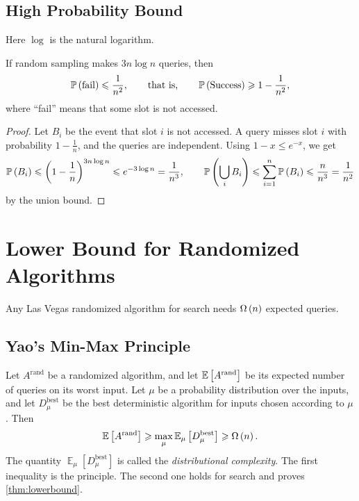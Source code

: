 \subsection{High Probability Bound}

Here $\log$ is the natural logarithm.

\begin{theorem}\label{thm:whp}
    If random sampling makes $3 n \log n$ queries, then
    \[\operatorname{\mathbb{P}}\left(\text{fail}\right) \leqslant \frac{1}{n^2},
        \qquad\text{that is,}\qquad
        \operatorname{\mathbb{P}}\left(\text{Success}\right) \geqslant 1 - \frac{1}{n^2},\]
    where ``fail'' means that some slot is not accessed.
\end{theorem}

\begin{proof}
    Let $B_i$ be the event that slot $i$ is not accessed. A query misses slot $i$ with
    probability $1 - \frac{1}{n}$, and the queries are independent. Using $1 - x \leq e^{-x}$, we get
    \[\operatorname{\mathbb{P}}\left(B_i\right) \leqslant \left(1 - \frac{1}{n}\right)^{3 n \log n}
        \leqslant e^{-3 \log n} = \frac{1}{n^3},
        \qquad
        \operatorname{\mathbb{P}}\left(\bigcup_{i} B_i\right) \leqslant \sum_{i=1}^{n} \operatorname{\mathbb{P}}\left(B_i\right) \leqslant \frac{n}{n^3} = \frac{1}{n^2}\]
    by the union bound.
\end{proof}

\section{Lower Bound for Randomized Algorithms}

\begin{theorem}\label{thm:lowerbound}
    Any Las Vegas randomized algorithm for search needs $\Omega\left(n\right)$ expected queries.
\end{theorem}

\subsection*{Yao's Min-Max Principle}

Let $A^{\mathrm{rand}}$ be a randomized algorithm, and let $\operatorname{\mathbb{E}}\left[A^{\mathrm{rand}}\right]$ be its
expected number of queries on its worst input. Let $\mu$ be a probability distribution over the inputs,
and let $D^{\mathrm{best}}_{\mu}$ be the best deterministic algorithm for inputs chosen
according to $\mu$. Then
\[\operatorname{\mathbb{E}}\left[A^{\mathrm{rand}}\right]
    \geqslant \max_{\mu} \operatorname{\mathbb{E}}_{\mu}\left[D^{\mathrm{best}}_{\mu}\right]
    \geqslant \Omega\left(n\right).\]
The quantity $\operatorname{\mathbb{E}}_{\mu}\left[D^{\mathrm{best}}_{\mu}\right]$ is called the
\emph{distributional complexity}. The first inequality is the principle. The second one holds for
search and proves \cref{thm:lowerbound}.

